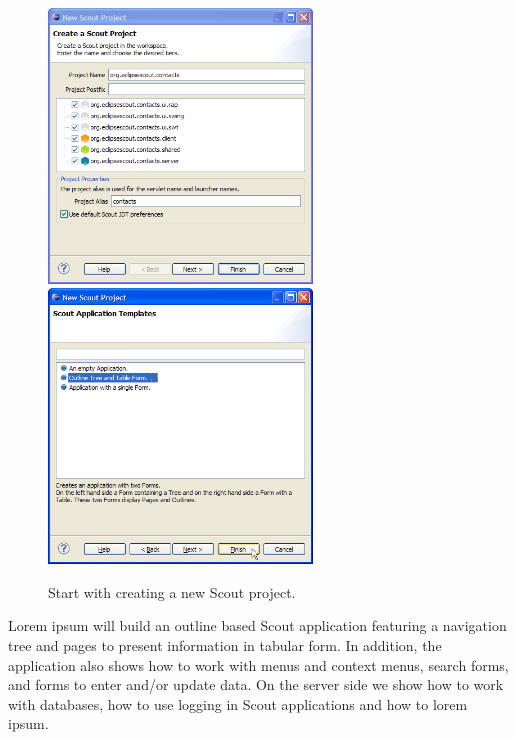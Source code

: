 \documentclass[a4paper,10pt,twoside]{book}
\begin{document}
\begin{figure}
\includegraphics[width=7cm]{new_project_contacts_1.png} \hspace{5mm}
\includegraphics[width=7cm]{new_project_contacts_2.png}
\caption{Start with creating a new Scout project. }
\end{figure}

Lorem ipsum will build an outline based Scout application featuring a navigation tree and pages to present information in tabular form. 
In addition, the application also shows how to work with menus and context menus, search forms, and forms to enter and/or update data. 
On the server side we show how to work with databases, how to use logging in Scout applications and how to lorem ipsum. 
\end{document}
